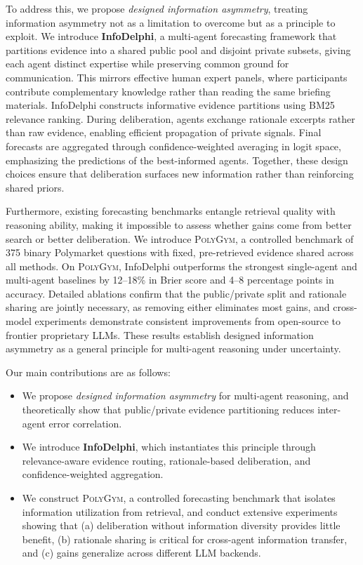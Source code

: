 \documentclass[11pt]{article}
\theoremstyle{plain}
\theoremstyle{definition}
\begin{document}
To address this, we propose \textit{designed information asymmetry}, treating information asymmetry not as a limitation to overcome but as a principle to exploit.
We introduce \textbf{InfoDelphi}, a multi-agent forecasting framework that partitions evidence into a shared public pool and disjoint private subsets, giving each agent distinct expertise while preserving common ground for communication.
This mirrors effective human expert panels, where participants contribute complementary knowledge rather than reading the same briefing materials.
InfoDelphi constructs informative evidence partitions using BM25 relevance ranking.
During deliberation, agents exchange rationale excerpts rather than raw evidence, enabling efficient propagation of private signals.
Final forecasts are aggregated through confidence-weighted averaging in logit space, emphasizing the predictions of the best-informed agents.
Together, these design choices ensure that deliberation surfaces new information rather than reinforcing shared priors.

Furthermore, existing forecasting benchmarks entangle retrieval quality with reasoning ability, making it impossible to assess whether gains come from better search or better deliberation.
We introduce \textsc{PolyGym}, a controlled benchmark of 375 binary Polymarket questions with fixed, pre-retrieved evidence shared across all methods.
On \textsc{PolyGym}, InfoDelphi outperforms the strongest single-agent and multi-agent baselines by 12--18\% in Brier score and 4--8 percentage points in accuracy.
Detailed ablations confirm that the public/private split and rationale sharing are jointly necessary, as removing either eliminates most gains, and cross-model experiments demonstrate consistent improvements from open-source to frontier proprietary LLMs.
These results establish designed information asymmetry as a general principle for multi-agent reasoning under uncertainty.

Our main contributions are as follows:
\begin{itemize}[nosep,leftmargin=20pt,topsep=2pt,itemsep=1pt,parsep=0pt]
  \item We propose \textit{designed information asymmetry}  for multi-agent reasoning, and theoretically show that public/private evidence partitioning reduces inter-agent error correlation.
  
  \item We introduce \textbf{InfoDelphi}, which instantiates this principle through relevance-aware evidence routing, rationale-based deliberation, and confidence-weighted aggregation.
  
  \item We construct \textsc{PolyGym}, a controlled forecasting benchmark that isolates information utilization from retrieval, and conduct extensive experiments showing that (a) deliberation without information diversity provides little benefit, (b) rationale sharing is critical for cross-agent information transfer, and (c) gains generalize across different LLM backends.
\end{itemize}
\end{document}
